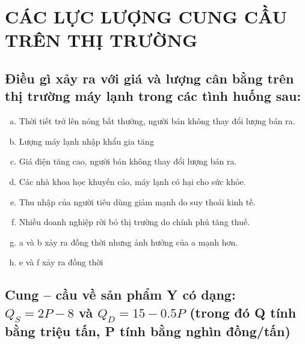 \documentclass{report}
\begin{document}
\setcounter{chapter}{2}
\chapter{CÁC LỰC LƯỢNG 
CUNG CẦU TRÊN THỊ 
TRƯỜNG}

\section{Điều gì xảy ra với giá và lượng cân bằng trên thị trường máy lạnh trong các
  tình huống sau:}

\begin{enumerate}[(a)]
    \item Thời tiết trở lên nóng bất thường, người bán không thay đổi lượng bán ra.
    \item  Lượng máy lạnh nhập khẩu gia tăng
    \item  Giá điện tăng cao, người bán không thay đổi lượng bán ra.
    \item  Các nhà khoa học khuyến cáo, máy lạnh có hại cho sức khỏe.
    \item  Thu nhập của người tiêu dùng giảm mạnh do suy thoái kinh tế.
    \item  Nhiều doanh nghiệp rời bỏ thị trường do chính phủ tăng thuế.
    \item  a và b xảy ra đồng thời nhưng ảnh hưởng của a mạnh hơn.
    \item  e và f xảy ra đồng thời
\end{enumerate}

\section{Cung – cầu về sản phẩm Y có dạng: $Q_S = 2P - 8$ và $Q_D = 15 - 0.5P$
  (trong đó Q tính bằng triệu tấn, P tính bằng nghìn đồng/tấn)}
\end{document}

